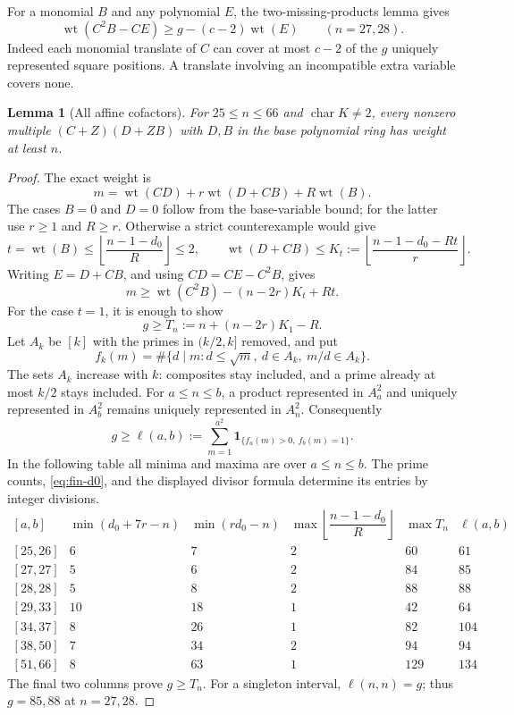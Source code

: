 \documentclass[11pt]{article}
\DeclareMathOperator{\wt}{wt}\DeclareMathOperator{\ord}{ord}
\numberwithin{equation}{section}
\newtheorem{lemma}[theorem]{Lemma}
\theoremstyle{definition}\newtheorem{definition}[theorem]{Definition}
\theoremstyle{remark}\newtheorem{remark}[theorem]{Remark}
\begin{document}
For a monomial $B$ and any polynomial $E$, the two-missing-products
lemma gives
\begin{equation}\label{eq:fin-unique-cover-bound}
 \wt(C^2B-CE)\ge g-(c-2)\wt(E)\qquad(n=27,28).
\end{equation}
Indeed each monomial translate of $C$ can cover at most $c-2$ of
the $g$ uniquely represented square positions. A translate involving
an incompatible extra variable covers none.

\begin{lemma}[All affine cofactors]\label{lem:fin-affine}
For $25\le n\le66$ and $\operatorname{char}K\ne2$, every nonzero
multiple $(C+Z)(D+ZB)$ with $D,B$ in the base polynomial ring has weight
at least $n$.
\end{lemma}
\begin{proof}
The exact weight is
\begin{equation}\label{eq:fin-affine-weight}
 m=\wt(CD)+r\wt(D+CB)+R\wt(B).
\end{equation}
The cases $B=0$ and $D=0$ follow from the base-variable bound; for the
latter use $r\ge1$ and $R\ge r$. Otherwise a strict counterexample
would give
\[
 t=\wt(B)\le\left\lfloor\frac{n-1-d_0}{R}\right\rfloor\le2,
 \qquad
 \wt(D+CB)\le K_t:=\left\lfloor\frac{n-1-d_0-Rt}{r}\right\rfloor.
\]
Writing $E=D+CB$, and using $CD=CE-C^2B$, gives
\begin{equation}\label{eq:fin-affine-budget}
 m\ge\wt(C^2B)-(n-2r)K_t+Rt.
\end{equation}
For the case $t=1$, it is enough to show
\[
 g\ge T_n:=n+(n-2r)K_1-R.
\]
Let $A_k$ be $[k]$ with the primes in $(k/2,k]$ removed, and put
\[
 f_k(m)=\#\{d\mid m:d\le\sqrt m,\ d\in A_k,\ m/d\in A_k\}.
\]
The sets $A_k$ increase with $k$: composites stay included, and a
prime already at most $k/2$ stays included. For $a\le n\le b$, a
product represented in $A_a^2$ and uniquely represented in $A_b^2$
remains uniquely represented in $A_n^2$. Consequently
\[
 g\ge\ell(a,b):=\sum_{m=1}^{a^2}
       \mathbf1_{\{f_a(m)>0,\ f_b(m)=1\}}.
\]
In the following table all minima and maxima are over $a\le n\le b$.
The prime counts, \eqref{eq:fin-d0}, and the displayed divisor formula
determine its entries by integer divisions.
\begingroup\small
\begin{equation}\label{eq:fin-block-budgets}
\begin{array}{c|r|r|r|r|r}
[a,b]&\min(d_0+7r-n)&\min(rd_0-n)&
 \max\left\lfloor\dfrac{n-1-d_0}{R}\right\rfloor&\max T_n&\ell(a,b)\\\hline
{[25,26]}&6&7&2&60&61\\
{[27,27]}&5&6&2&84&85\\
{[28,28]}&5&8&2&88&88\\
{[29,33]}&10&18&1&42&64\\
{[34,37]}&8&26&1&82&104\\
{[38,50]}&7&34&2&94&94\\
{[51,66]}&8&63&1&129&134
\end{array}
\end{equation}
\endgroup
The final two columns prove $g\ge T_n$. For a singleton interval,
$\ell(n,n)=g$; thus $g=85,88$ at $n=27,28$.


\end{proof}
\end{document}
